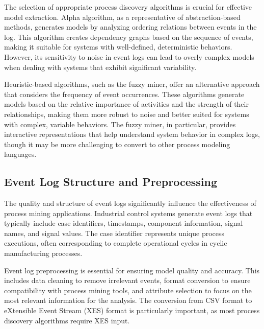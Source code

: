 The selection of appropriate process discovery algorithms is crucial for effective model extraction. Alpha algorithm, as a representative of abstraction-based methods, generates models by analyzing ordering relations between events in the log. This algorithm creates dependency graphs based on the sequence of events, making it suitable for systems with well-defined, deterministic behaviors. However, its sensitivity to noise in event logs can lead to overly complex models when dealing with systems that exhibit significant variability.

Heuristic-based algorithms, such as the fuzzy miner, offer an alternative approach that considers the frequency of event occurrences. These algorithms generate models based on the relative importance of activities and the strength of their relationships, making them more robust to noise and better suited for systems with complex, variable behaviors. The fuzzy miner, in particular, provides interactive representations that help understand system behavior in complex logs, though it may be more challenging to convert to other process modeling languages.

\subsection{Event Log Structure and Preprocessing}

The quality and structure of event logs significantly influence the effectiveness of process mining applications. Industrial control systems generate event logs that typically include case identifiers, timestamps, component information, signal names, and signal values. The case identifier represents unique process executions, often corresponding to complete operational cycles in cyclic manufacturing processes.

Event log preprocessing is essential for ensuring model quality and accuracy. This includes data cleaning to remove irrelevant events, format conversion to ensure compatibility with process mining tools, and attribute selection to focus on the most relevant information for the analysis. The conversion from CSV format to eXtensible Event Stream (XES) format is particularly important, as most process discovery algorithms require XES input.

